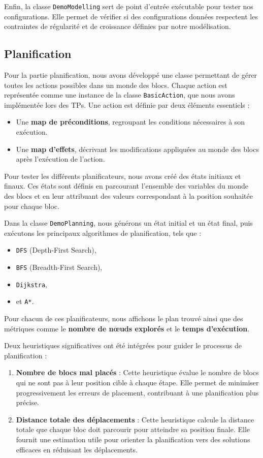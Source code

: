 \documentclass[12pt]{article}
\begin{document}
Enfin, la classe \texttt{DemoModelling} sert de point d'entrée exécutable pour tester nos configurations. Elle permet de vérifier si des configurations données respectent les contraintes de régularité et de croissance définies par notre modélisation.
\subsection{Planification}
Pour la partie planification, nous avons développé une classe permettant de gérer toutes les actions possibles dans un monde des blocs. Chaque action est représentée comme une instance de la classe \texttt{BasicAction}, que nous avons implémentée lors des TPs. Une action est définie par deux éléments essentiels :
\begin{itemize}
    \item Une \textbf{map de préconditions}, regroupant les conditions nécessaires à son exécution.
    \item Une \textbf{map d’effets}, décrivant les modifications appliquées au monde des blocs après l’exécution de l’action.
\end{itemize}

Pour tester les différents planificateurs, nous avons créé des états initiaux et finaux. Ces états sont définis en parcourant l’ensemble des variables du monde des blocs et en leur attribuant des valeurs correspondant à la position souhaitée pour chaque bloc.

Dans la classe \texttt{DemoPlanning}, nous générons un état initial et un état final, puis exécutons les principaux algorithmes de planification, tels que :
\begin{itemize}
    \item \texttt{DFS} (Depth-First Search),
    \item \texttt{BFS} (Breadth-First Search),
    \item \texttt{Dijkstra},
    \item et \texttt{A*}.
\end{itemize}
Pour chacun de ces planificateurs, nous affichons le plan trouvé ainsi que des métriques comme le \textbf{nombre de nœuds explorés} et le \textbf{temps d’exécution}.

Deux heuristiques significatives ont été intégrées pour guider le processus de planification :
\begin{enumerate}
    \item \textbf{Nombre de blocs mal placés} : Cette heuristique évalue le nombre de blocs qui ne sont pas à leur position cible à chaque étape. Elle permet de minimiser progressivement les erreurs de placement, contribuant à une planification plus précise.
    \item \textbf{Distance totale des déplacements} : Cette heuristique calcule la distance totale que chaque bloc doit parcourir pour atteindre sa position finale. Elle fournit une estimation utile pour orienter la planification vers des solutions efficaces en réduisant les déplacements.
\end{enumerate}
\end{document}
